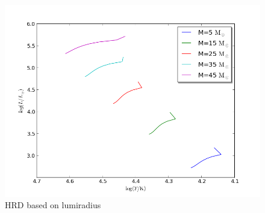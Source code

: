 \documentclass[a4paper,10pt]{article}
\begin{document}
 \begin{figure}[h!]
  \includegraphics[width=\textwidth]{lumiradius}
  \caption{HRD based on lumiradius\label{lumiradius}}
 \end{figure}
\\
 
\end{document}
